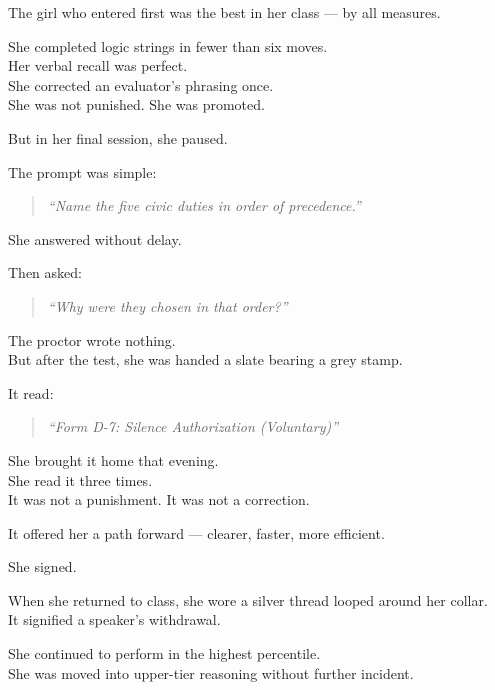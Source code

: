 \documentclass[9pt]{article}
\begin{document}
\vspace{1em}

The girl who entered first was the best in her class — by all measures.

She completed logic strings in fewer than six moves.\\
Her verbal recall was perfect.\\
She corrected an evaluator’s phrasing once.\\
She was not punished. She was promoted.

But in her final session, she paused.

The prompt was simple:

\begin{quote}
\textit{“Name the five civic duties in order of precedence.”}
\end{quote}

She answered without delay.

Then asked:

\begin{quote}
\textit{“Why were they chosen in that order?”}
\end{quote}

The proctor wrote nothing.\\
But after the test, she was handed a slate bearing a grey stamp.

It read:

\begin{quote}
\textit{“Form D-7: Silence Authorization (Voluntary)”}
\end{quote}

\vspace{1em}

She brought it home that evening.\\
She read it three times.\\
It was not a punishment. It was not a correction.

It offered her a path forward — clearer, faster, more efficient.

She signed.

\vspace{1em}

When she returned to class, she wore a silver thread looped around her collar.\\
It signified a speaker’s withdrawal.

She continued to perform in the highest percentile.\\
She was moved into upper-tier reasoning without further incident.
\end{document}
